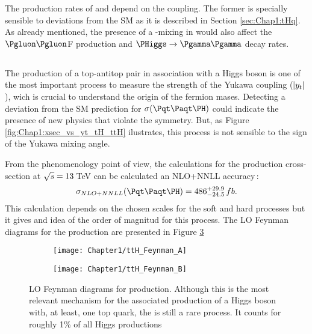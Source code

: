 
The production rates of \ttH and \tH depend on the \yt coupling. The former
is specially sensible to \yt deviations from the SM as it is described in Section
\ref{sec:Chap1:tHq}. As already mentioned, the presence of a \CP-mixing in \yt would also affect the
$\Pgluon \Pgluon$F production and $\PHiggs \rightarrow \Pgamma \Pgamma$ decay rates.



\subsection{\ttH}
\label{sec:Chap1:ttH}
The production of a top-antitop pair in association with a Higgs boson is one of the most important process
to measure the strength of the Yukawa coupling ($|y_{t}|$), wich is crucial to understand the origin of the fermion mases.
Detecting a deviation from the SM prediction for $\sigma(\ttH)$ could indicate the presence of new physics that
violate the \CP symmetry. But, as Figure \ref{fig:Chap1:xsec_vs_yt_tH_ttH} ilustrates, this process 
is not sensible to the sign of the Yukawa mixing angle.


From the phenomenology point of view, the calculations for the \ttH production cross-section
at $\sqrt{s}=13\,$TeV can be calculated an NLO+NNLL
accuracy\,\cite{Broggio:2016lfj}:
\begin{equation*}
	\sigma_{NLO+NNLL} (\ttH) = 486^{+29.9}_{-24.5}\,fb.
\end{equation*}
This calculation depends on the chosen scales for the soft and hard processes but it gives and idea of the order 
of magnitud for this process. 
The LO Feynman diagrams for the \ttH production are presented in Figure \ref{fig:Chap1:ttH:Feynman}

\begin{figure}
\centering
\begin{subfigure}{.45\textwidth}
  \centering
  \texttt{[image: Chapter1/ttH\_Feynman\_A]}
  \caption{}
  \label{fig:Chap1:ttH:Feynman:A}
\end{subfigure}%
\begin{subfigure}{.45\textwidth}
  \centering
  \texttt{[image: Chapter1/ttH\_Feynman\_B]}
  \caption{}
  \label{fig:Chap1:ttH:tFeynman:B}
\end{subfigure}%
\caption{LO Feynman diagrams for \ttH production. Although this is the most 
relevant mechanism for the associated production of a Higgs boson with, at least, one top quark, 
the \ttH is still a rare process. It counts for roughly 1\% of all Higgs productions}
\label{fig:Chap1:ttH:Feynman}
\end{figure}


